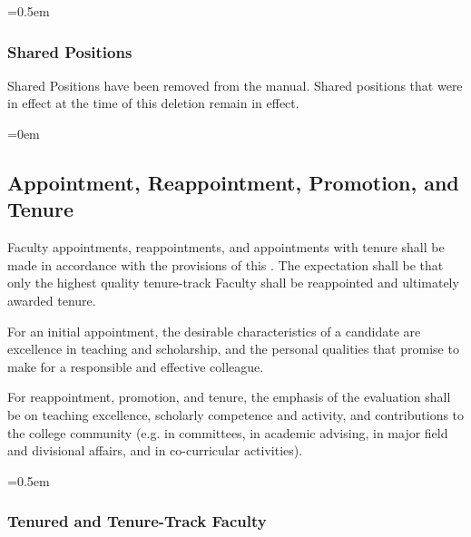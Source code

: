 \documentclass{manual}
\let\oldsubsection\subsection
\renewcommand\subsection{\leftskip=0em\oldsubsection}
\let\oldsubsubsection\subsubsection
\renewcommand\subsubsection{\leftskip=0.5em\oldsubsubsection}
\begin{document}
\subsubsection{Shared Positions}
Shared Positions have been removed from the manual. Shared positions that were in effect at the time of this deletion remain in effect.



\subsection{Appointment, Reappointment, Promotion, and Tenure}\label{sec:AppointmentReappointmentPromotionAndTenure}
Faculty appointments, reappointments, and appointments with tenure shall be made in accordance with the provisions of this . The expectation shall be that only the highest quality tenure-track Faculty shall be reappointed and ultimately awarded tenure.

For an initial appointment, the desirable characteristics of a candidate are excellence in teaching and scholarship, and the personal qualities that promise to make for a responsible and effective colleague.

For reappointment, promotion, and tenure, the emphasis of the evaluation shall be on teaching excellence, scholarly competence and activity, and contributions to the college community (e.g. in committees, in academic advising, in major field and divisional affairs, and in co-curricular activities).


\subsubsection{Tenured and Tenure-Track Faculty}\label{sub:TenuredAndTenureTrackFaculty}
\end{document}
